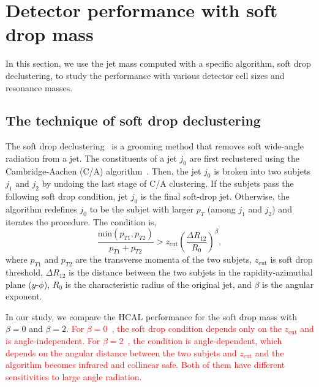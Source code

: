 \section{Detector performance with soft drop mass}

In this section, we use the jet mass computed with a specific algorithm, soft 
drop declustering, to study the performance with various detector 
cell sizes and resonance masses. 

\subsection{The technique of soft drop declustering}
The soft drop declustering~\cite{Larkoski:2014wba} is a grooming method 
that removes soft wide-angle radiation from a jet. The constituents of a jet 
$j_0$ are first reclustered using the Cambridge-Aachen
 (C/A) algorithm~\cite{Dokshitzer:1997in,Wobisch:1998wt}. Then, the jet $j_0$ 
is broken into two subjets $j_1$ and $j_2$ by undoing the last stage of C/A 
clustering.
If the subjets pass the following soft drop condition, jet $j_0$ is the final 
soft-drop jet. Otherwise, the algorithm redefines $j_0$ to be the subjet with 
larger $p_T$ (among $j_1$ and $j_2$) and iterates the procedure. The condition is, 
\begin{equation} \label{eq:soft-drop}
\frac{\mathrm{min}(p_{T1},p_{T2})}{p_{T1}+p_{T2}}>z_\mathrm{cut}(\frac{\Delta R_{12}}{R_{0}})^{\beta},
\end{equation}
where $p_{T1}$ and $p_{T2}$ are the transverse momenta of the two subjets, 
$z_\mathrm{cut}$ is soft drop threshold, 
$\Delta R_{12}$ is the distance between the two subjets in the 
rapidity-azimuthal plane ($y$-$\phi$), $R_0$ is the characteristic radius 
of the original jet, and $\beta$ is the angular exponent.

In our study, we compare the HCAL performance for  the soft drop mass with 
$\beta=0$  and $\beta=2$. \textcolor{red}{For $\beta=0$~\cite{CMS:2017wyc,Tripathee:2017ybi}, the soft drop condition 
depends only on the $z_\mathrm{cut}$ and is angle-independent. For $\beta=2$~\cite{Aaboud:2017qwh}, the condition is angle-dependent, which depends on 
the angular distance between the two subjets and $z_\mathrm{cut}$ and the 
algorithm becomes infrared and collinear safe. Both of them have different sensitivities to large angle radiation.}

